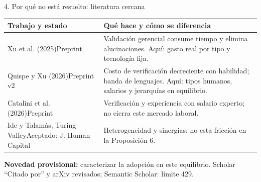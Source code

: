 \documentclass[aspectratio=169,11pt]{beamer}
\begin{document}
\begin{frame}{4. Por qué no está resuelto: literatura cercana}
\small
\begin{tabular}{@{}p{.29\linewidth}p{.64\linewidth}@{}}\toprule
Trabajo y estado & Qué hace y cómo se diferencia\\\midrule
Xu et al. (2025)\newline Preprint & Validación gerencial consume tiempo y elimina alucinaciones. Aquí: gasto real por tipo y tecnología fija.\\[5pt]
Quispe y Xu (2026)\newline Preprint v2 & Costo de verificación decreciente con habilidad; banda de lenguajes. Aquí: tipos humanos, salarios y jerarquías en equilibrio.\\[5pt]
Catalini et al. (2026)\newline Preprint & Verificación y experiencia con salario experto; no cierra este mercado laboral.\\[5pt]
Ide y Talamàs, Turing Valley\newline Aceptado: J. Human Capital & Heterogeneidad y sinergias; no esta fricción en la Proposición 6.\\\bottomrule
\end{tabular}
\medskip
\textbf{Novedad provisional:} caracterizar la adopción en este equilibrio. Scholar ``Citado por'' y arXiv revisados; Semantic Scholar: límite 429.
\end{frame}
\end{document}
